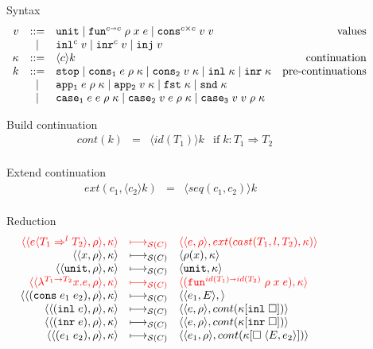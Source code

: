 \documentclass[acmsmall,review,anonymous]{acmart}\settopmatter{printfolios=true,printccs=false,printacmref=false}
\newcommand{\stxrule}[3]{#1 & ::= & #3 & \text{#2}\\}
\newcommand{\stxrulecont}[1]{& | & #1 & \\}
\newcommand{\funrule}[3]{#1 &=& #2 & #3\\}
\newcommand{\sOOinspect}[3]{\langle\langle#1,#2\rangle,#3\rangle}
\newcommand{\sOOreturn}[2]{\langle#1,#2\rangle}
\newcommand{\sOOhalt}[1]{\mathtt{Halt} \; #1}
\newcommand{\POOfun}[2]{#1 \shortrightarrow #2}
\newcommand{\POOprod}[2]{#1 \times #2}
\newcommand{\eOOvar}[1]{#1}
\newcommand{\eOOsole}[0]{\mathtt{unit}}
\newcommand{\eOOlam}[4]{\lambda^{#1\rightarrow{}#2}#3.#4}
\newcommand{\eOOapp}[2]{#1 \; #2}
\newcommand{\eOOcons}[2]{\mathtt{cons} \; #1 \; #2}
\newcommand{\eOOinl}[1]{\mathtt{inl} \; #1}
\newcommand{\eOOinr}[1]{\mathtt{inr} \; #1}
\newcommand{\eOOcast}[4]{#1 \langle \cOOcast{#2}{#3}{#4} \rangle}
\newcommand{\cOOcast}[3]{#1 \Rightarrow^{#2} #3}
\newcommand{\rOOsucc}[1]{\mathtt{succ}\;#1}
\newcommand{\rOOfail}[1]{\mathtt{fail}\;#1}
\newcommand{\kOOinl}[1]{#1[\mathtt{inl} \; \square]}
\newcommand{\kOOinr}[1]{#1[\mathtt{inr} \; \square]}
\newcommand{\kOOappI}[3]{
	#3[\square \; \langle#1,#2\rangle ]
}
\newcommand{\hcvOOinj}[2]{\mathtt{inj} \; #2}
\newcommand{\hcvOOfun}[5]{\mathtt{fun}^{\POOfun{#1}{#5}} \; #2 \; #3 \; #4}
\newcommand{\hcvOOtt}[0]{\mathtt{unit}}
\newcommand{\hcvOOcons}[4]{\mathtt{cons}^{\POOprod{#2}{#4}}\;#1\;#3}
\newcommand{\hcvOOinl}[2]{\mathtt{inl}^{#2}\;#1}
\newcommand{\hcvOOinr}[2]{\mathtt{inr}^{#2}\;#1}
\newcommand{\hckOOmt}[0]{\mathtt{stop}}
\newcommand{\sidecond}[1]{\text{if}\;#1}
\newcommand{\judgeSreduce}[3]{#2 \longmapsto_{\mathcal{S}(#1)} #3}
\newcommand{\redruleS}[3]{#1 & \longmapsto_{\mathcal{S}(C)} & #2 & #3\\}
\newcommand{\hiredruleS}[3]{\highlight{#1} & 
\highlight{\longmapsto_{\mathcal{S}(C)}} & \highlight{#2} & \highlight{#3} \\}
\newcommand{\highlight}[1]{{\color{red} #1}}
\begin{document}
\begin{figure}
	Syntax
	\[
	\begin{array}{rclr}
	
	\stxrule{v}{values}{
		\hcvOOtt \mid
		\hcvOOfun{c}{\rho}{x}{e}{c} \mid
		\hcvOOcons{v}{c}{v}{c}
	}
	\stxrulecont{
		\hcvOOinl{v}{c} \mid
		\hcvOOinr{v}{c} \mid
		\hcvOOinj{P}{v}
	}
	\stxrule{\kappa}{continuation}{
		\langle c \rangle k
	}
	\stxrule{k}{pre-continuations}{
		\hckOOmt \mid{}
		\mathtt{cons_1} \; e \; \rho \; \kappa \mid{}
		\mathtt{cons_2} \; v \; \kappa \mid{}
		\mathtt{inl} \; \kappa \mid{}
		\mathtt{inr} \; \kappa
	}
	\stxrulecont{
		\mathtt{app_1} \; e \; \rho \; \kappa \mid{}
		\mathtt{app_2} \; v \; \kappa \mid{}
		\mathtt{fst} \; \kappa \mid{}
		\mathtt{snd} \; \kappa
	}
	\stxrulecont{
		\mathtt{case_1} \; e \; e \; \rho \; \kappa \mid
		\mathtt{case_2} \; v \; e \; \rho \; \kappa \mid{}
		\mathtt{case_3} \; v \; v \; \rho \; \kappa
	}
	\end{array}
	\]
	
	Build continuation 
	\[
	\begin{array}{rclc}
	\funrule{cont(k)}{\langle id(T_1) \rangle k}{
		\sidecond{k : T_1 \Longrightarrow T_2}}
	\end{array}
	\]
	
	Extend continuation 
	\[
	\begin{array}{rclc}
	\funrule{ext(c_1,\langle c_2 \rangle k)}{\langle seq(c_1,c_2) \rangle k}{}
	\end{array}
	\]
	
	Reduction \fbox{$\judgeSreduce{C}{s}{s}$}
	\[
	\begin{array}{rclr}
	\hiredruleS{
		\sOOinspect{\eOOcast{e}{T_1}{l}{T_2}}{\rho}{\kappa}
	}{
		\sOOinspect{e}{\rho}{ext(cast(T_1,l,T_2),\kappa)}
	}{}
	\redruleS{
		\sOOinspect{\eOOvar{x}}{\rho}{\kappa}
	}{	
		\sOOreturn{\rho(x)}{\kappa}
	}{}
	\redruleS{
		\sOOinspect{\eOOsole}{\rho}{\kappa}
	}{
		\sOOreturn{\hcvOOtt}{\kappa}
	}{}
	\hiredruleS{
		\sOOinspect{\eOOlam{T_1}{T_2}{x}{e}}{\rho}{\kappa}
	}{
		\sOOreturn{(\hcvOOfun{id(T_1)}{\rho}{x}{e}{id(T_2)})}{\kappa}
	}{}
	\redruleS{
		\sOOinspect{(\eOOcons{e_1}{e_2})}{\rho}{\kappa}
	}{
		\sOOinspect{e_1}{E}{}
	}{}
	\redruleS{
		\sOOinspect{(\eOOinl{e})}{\rho}{\kappa}
	}{
		\sOOinspect{e}{\rho}{cont(\kOOinl{\kappa})}
	}{}
	\redruleS{
		\sOOinspect{(\eOOinr{e})}{\rho}{\kappa}
	}{
		\sOOinspect{e}{\rho}{cont(\kOOinr{\kappa})}
	}{}
	\redruleS{
		\sOOinspect{(\eOOapp{e_1}{e_2})}{\rho}{\kappa}
	}{
		\sOOinspect{e_1}{\rho}{cont(\kOOappI{E}{e_2}{\kappa})}}{}
	

\end{array}\]
\end{figure}
\end{document}
